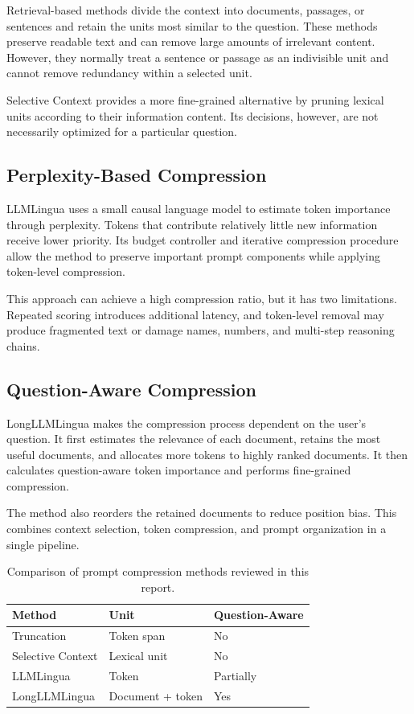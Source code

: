\documentclass[10pt,a4paper,twocolumn]{article}
\begin{document}
Retrieval-based methods divide the context into documents, passages, or sentences and retain the units most similar to the question. These methods preserve readable text and can remove large amounts of irrelevant content. However, they normally treat a sentence or passage as an indivisible unit and cannot remove redundancy within a selected unit.

Selective Context \citep{li-etal-2023-compressing} provides a more fine-grained alternative by pruning lexical units according to their information content. Its decisions, however, are not necessarily optimized for a particular question.

\subsection{Perplexity-Based Compression}

LLMLingua uses a small causal language model to estimate token importance through perplexity. Tokens that contribute relatively little new information receive lower priority. Its budget controller and iterative compression procedure allow the method to preserve important prompt components while applying token-level compression.

This approach can achieve a high compression ratio, but it has two limitations. Repeated scoring introduces additional latency, and token-level removal may produce fragmented text or damage names, numbers, and multi-step reasoning chains.

\subsection{Question-Aware Compression}

LongLLMLingua makes the compression process dependent on the user's question. It first estimates the relevance of each document, retains the most useful documents, and allocates more tokens to highly ranked documents. It then calculates question-aware token importance and performs fine-grained compression.

The method also reorders the retained documents to reduce position bias. This combines context selection, token compression, and prompt organization in a single pipeline.

\begin{table}[t]
\centering
\small
\begin{tabular}{@{}p{2.2cm}p{2.3cm}p{2.3cm}@{}}
\toprule
\textbf{Method} & \textbf{Unit} & \textbf{Question-Aware} \\
\midrule
Truncation & Token span & No \\
Selective Context & Lexical unit & No \\
LLMLingua & Token & Partially \\
LongLLMLingua & Document + token & Yes \\
\bottomrule
\end{tabular}
\caption{Comparison of prompt compression methods reviewed in this report.}
\label{tab:methods}
\end{table}
\end{document}
